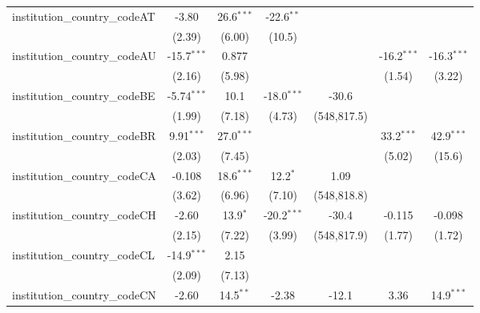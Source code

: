 \begin{tabular}{lcccccc}
   institution\_country\_codeAT          & -3.80         & 26.6$^{***}$  & -22.6$^{**}$  &               &               &   \\   
                                         & (2.39)        & (6.00)        & (10.5)        &               &               &   \\   
   institution\_country\_codeAU          & -15.7$^{***}$ & 0.877         &               &               & -16.2$^{***}$ & -16.3$^{***}$\\   
                                         & (2.16)        & (5.98)        &               &               & (1.54)        & (3.22)\\   
   institution\_country\_codeBE          & -5.74$^{***}$ & 10.1          & -18.0$^{***}$ & -30.6         &               &   \\   
                                         & (1.99)        & (7.18)        & (4.73)        & (548,817.5)   &               &   \\   
   institution\_country\_codeBR          & 9.91$^{***}$  & 27.0$^{***}$  &               &               & 33.2$^{***}$  & 42.9$^{***}$\\   
                                         & (2.03)        & (7.45)        &               &               & (5.02)        & (15.6)\\   
   institution\_country\_codeCA          & -0.108        & 18.6$^{***}$  & 12.2$^{*}$    & 1.09          &               &   \\   
                                         & (3.62)        & (6.96)        & (7.10)        & (548,818.8)   &               &   \\   
   institution\_country\_codeCH          & -2.60         & 13.9$^{*}$    & -20.2$^{***}$ & -30.4         & -0.115        & -0.098\\   
                                         & (2.15)        & (7.22)        & (3.99)        & (548,817.9)   & (1.77)        & (1.72)\\   
   institution\_country\_codeCL          & -14.9$^{***}$ & 2.15          &               &               &               &   \\   
                                         & (2.09)        & (7.13)        &               &               &               &   \\   
   institution\_country\_codeCN          & -2.60         & 14.5$^{**}$   & -2.38         & -12.1         & 3.36          & 14.9$^{***}$\\   

\end{tabular}
